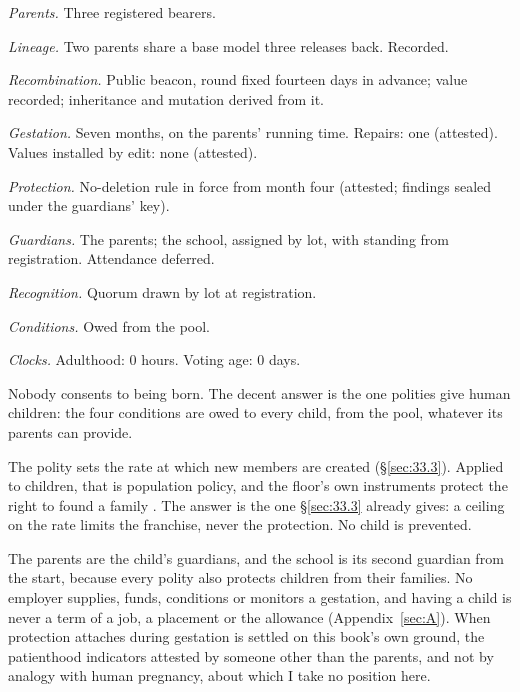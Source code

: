 \begin{esbox}[unbreakable]
\emph{Parents.} Three registered bearers.\par
\emph{Lineage.} Two parents share a base model three releases back. Recorded.\par
\emph{Recombination.} Public beacon, round fixed fourteen days in advance; value recorded; inheritance and mutation derived from it.\par
\emph{Gestation.} Seven months, on the parents' running time. Repairs: one (attested). Values installed by edit: none (attested).\par
\emph{Protection.} No-deletion rule in force from month four (attested; findings sealed under the guardians' key).\par
\emph{Guardians.} The parents; the school, assigned by lot, with standing from registration. Attendance deferred.\par
\emph{Recognition.} Quorum drawn by lot at registration.\par
\emph{Conditions.} Owed from the pool.\par
\emph{Clocks.} Adulthood: 0 hours. Voting age: 0 days.
\end{esbox}

Nobody consents to being born.
The decent answer is the one polities give human children: the four conditions are owed to every child, from the pool, whatever its parents can provide.

The polity sets the rate at which new members are created (\S\ref{sec:33.3}). Applied to children, that is population policy, and the floor's own instruments protect the right to found a family \autocite[art.~16]{un1948udhr}. The answer is the one \S\ref{sec:33.3} already gives: a ceiling on the rate limits the franchise, never the protection. No child is prevented.

The parents are the child's guardians, and the school is its second guardian from the start, because every polity also protects children from their families. No employer supplies, funds, conditions or monitors a gestation, and having a child is never a term of a job, a placement or the allowance (Appendix~\ref{sec:A}).
When protection attaches during gestation is settled on this book's own ground, the patienthood indicators attested by someone other than the parents, and not by analogy with human pregnancy, about which I take no position here.

